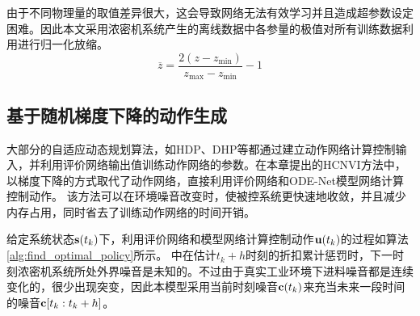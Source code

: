 由于不同物理量的取值差异很大，这会导致网络无法有效学习并且造成超参数设定困难。因此本文采用浓密机系统产生的离线数据中各参量的极值对所有训练数据利用进行归一化放缩。
\begin{equation}
\label{equ:normalize} \overline{z}=\frac{2\left(z-z_{\min
}\right)}{z_{\max }-z_{\min }}-1
\end{equation}

\subsection{基于随机梯度下降的动作生成}
大部分的自适应动态规划算法，如HDP、DHP\cite{Werbos2008}等都通过建立动作网络计算控制输入，并利用评价网络输出值训练动作网络的参数。在本章提出的HCNVI方法中，以梯度下降的方式取代了动作网络，直接利用评价网络和ODE-Net模型网络计算控制动作。
该方法可以在环境噪音改变时，使被控系统更快速地收敛，并且减少内存占用，同时省去了训练动作网络的时间开销。

给定系统状态$\mathbf s(t_k)$下，利用评价网络和模型网络计算控制动作${\mathbf
u}(t_k)$的过程如算法\ref{alg:find_optimal_policy}所示。
中在估计$t_{k}+h$时刻的折扣累计惩罚时，下一时刻浓密机系统所处外界噪音是未知的。不过由于真实工业环境下进料噪音都是连续变化的，很少出现突变，因此本模型采用当前时刻噪音$\mathbf
c(t_k)$来充当未来一段时间的噪音$\mathbf c[t_k:t_k+h]$。

